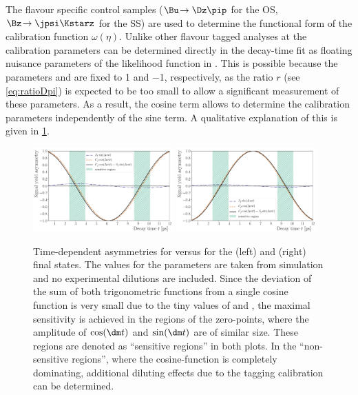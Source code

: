 The flavour specific control samples ($\Bu\!\to\Dz\pip$ for the OS, $\Bz\!\to\jpsi\Kstarz$ for the SS) are used to determine the functional form of the calibration function $\omega(\eta)$.
Unlike other flavour tagged analyses at \lhcb the calibration parameters can be determined directly in the decay-time fit as floating nuisance parameters of the likelihood function in \BdToDpi.
This is possible because the parameters \Cf and \Cfbar are fixed to \num{1} and \num{-1}, respectively, as the ratio $r$ (see \cref{eq:ratioDpi}) is expected to be too small to allow a significant measurement of these parameters.
As a result, the cosine term allows to determine the calibration parameters independently of the sine term.
A qualitative explanation of this is given in \cref{fig:FTstrategy}.
\begin{figure}[tbp]
    \centering
    \includegraphics[width=0.48\textwidth]{09FlavourTagging/figs/oscillation_f.pdf}
    \includegraphics[width=0.48\textwidth]{09FlavourTagging/figs/oscillation_fbar.pdf}
    \caption{Time-dependent asymmetries for \Bzb versus \Bz for the \Dm\pip (left) and \Dp\pim (right) final states.
    The values for the \CP parameters are taken from simulation and no experimental dilutions are included.
    Since the deviation of the sum of both trigonometric functions from a single cosine function is very small due to the tiny values of \Sf and \Sfbar, the maximal sensitivity is achieved in the regions of the zero-points, \ie where the amplitude of $\cos(\dm t)$ and $\sin(\dm t)$ are of similar size.
    These regions are denoted as \enquote{sensitive regions} in both plots.
    In the \enquote{non-sensitive regions}, where the cosine-function is completely dominating, additional diluting effects due to the tagging calibration can be determined.}
    \label{fig:FTstrategy}
\end{figure}


